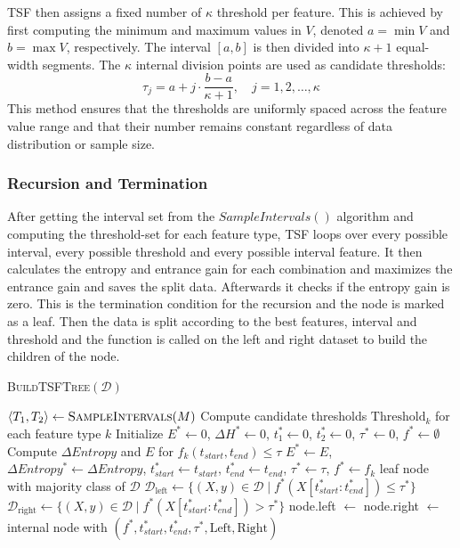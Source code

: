 TSF then assigns a fixed number of $\kappa$ threshold per feature.
This is achieved by first computing the minimum and 
maximum values in $V$, denoted $a = \min V$ and 
$b = \max V$, respectively. The interval $[a, b]$ 
is then divided into $\kappa + 1$ equal-width segments.
The $\kappa$ internal division points are used as 
candidate thresholds:
\begin{equation*}
\tau_j = a + j \cdot \frac{b - a}{\kappa + 1}, \quad j = 1, 2, \dots, \kappa
\end{equation*}
This method ensures that the thresholds are uniformly 
spaced across the feature value range and that their 
number remains constant regardless of data distribution or 
sample size. 

\subsubsection*{Recursion and Termination}
After getting the interval set from the $SampleIntervals()$ algorithm and computing the threshold-set for each feature type,
TSF loops over every possible interval, every possible threshold and every possible interval feature.
It then calculates the entropy and entrance gain for each combination and maximizes the entrance gain and saves the split data.
Afterwards it checks if the entropy gain is zero. This is the termination condition for the recursion and the node
is marked as a leaf. Then the data is split according to the best features, interval and threshold and the 
function is called on the left and right dataset to build the children of the node.
\begin{algorithm}[H]
\caption{\textsc{BuildTSFTree}$(\mathcal{D})$}
\begin{algorithmic}[1]
\State $\langle T_1, T_2 \rangle \gets \textsc{SampleIntervals}(M)$
\State Compute candidate thresholds $\text{Threshold}_k$ for each feature type $k$
\State Initialize $E^* \gets 0$, $\Delta H^* \gets 0$, $t_1^* \gets 0$, $t_2^* \gets 0$, $\tau^* \gets 0$, $f^* \gets \emptyset$
            \State Compute $\Delta Entropy$ and $E$ for $f_k(t_{start}, t_{end}) \le \tau$
                \State $E^* \gets E$, 
				\State $\Delta Entropy^* \gets \Delta Entropy$, 
				\State $t_{start}^* \gets t_{start}$, 
				\State $t_{end}^* \gets t_{end}$, 
				\State $\tau^* \gets \tau$, 
				\State $f^* \gets f_k$
            \EndIf
        \EndFor
    \EndFor
\EndFor
{}
    \State \Return leaf node with majority class of $\mathcal{D}$
\EndIf
\State $\mathcal{D}_{\text{left}} \gets \{(X, y) \in \mathcal{D} \mid f^*(X[t_{start}^*:t_{end}^*]) \le \tau^* \}$
\State $\mathcal{D}_{\text{right}} \gets \{(X, y) \in \mathcal{D} \mid f^*(X[t_{start}^*:t_{end}^*]) > \tau^* \}$
\State node.left $\gets$ 
\State node.right $\gets$ 
\State \Return internal node with $(f^*, t_{start}^*, t_{end}^*, \tau^*, \text{Left}, \text{Right})$
\end{algorithmic}
\end{algorithm}
